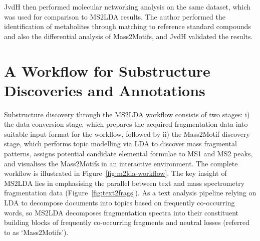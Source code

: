 JvdH then performed molecular networking analysis on the same dataset, which was used for comparison to MS2LDA results. The author performed the identification of metabolites through matching to reference standard compounds and also the differential analysis of Mass2Motifs, and JvdH validated the results. 

\section{A Workflow for Substructure Discoveries and Annotations\label{sub:ms2lda-workflow}}

Substructure discovery through the MS2LDA workflow consists of two stages: i) the data conversion stage, which prepares the acquired fragmentation data into suitable input format for the workflow, followed by ii) the Mass2Motif discovery stage, which performs topic modelling via LDA to discover mass fragmental patterns, assigns potential candidate elemental formulae to MS1 and MS2 peaks, and visualises the Mass2Motifs in an interactive environment. The complete workflow is illustrated in Figure~\ref{fig:m2lda-workflow}. The key insight of MS2LDA lies in emphasising the parallel between text and mass spectrometry fragmentation data (Figure~\ref{fig:text2frags}). As a text analysis pipeline relying on LDA to decompose documents into topics based on frequently co-occurring words, so MS2LDA decomposes fragmentation spectra into their constituent building blocks of frequently co-occurring fragments and neutral losses (referred to as ‘Mass2Motifs’). 

